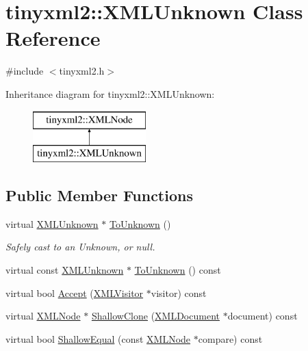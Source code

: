 \hypertarget{classtinyxml2_1_1_x_m_l_unknown}{}\section{tinyxml2\+:\+:X\+M\+L\+Unknown Class Reference}
\label{classtinyxml2_1_1_x_m_l_unknown}


{\ttfamily \#include $<$tinyxml2.\+h$>$}

Inheritance diagram for tinyxml2\+:\+:X\+M\+L\+Unknown\+:\begin{figure}[H]
\begin{center}
\leavevmode
\includegraphics[height=2.000000cm]{classtinyxml2_1_1_x_m_l_unknown}
\end{center}
\end{figure}
\subsection*{Public Member Functions}
\begin{DoxyCompactItemize}
\item 
virtual \hyperlink{classtinyxml2_1_1_x_m_l_unknown}{X\+M\+L\+Unknown} $\ast$ \hyperlink{classtinyxml2_1_1_x_m_l_unknown_af4374856421921cad578c8affae872b6}{To\+Unknown} ()
\begin{DoxyCompactList}\small\item\em Safely cast to an Unknown, or null. \end{DoxyCompactList}\item 
virtual const \hyperlink{classtinyxml2_1_1_x_m_l_unknown}{X\+M\+L\+Unknown} $\ast$ \hyperlink{classtinyxml2_1_1_x_m_l_unknown_a61b342b4f295cded1dc2f4402e97f07e}{To\+Unknown} () const
\item 
virtual bool \hyperlink{classtinyxml2_1_1_x_m_l_unknown_a8a06b8c82117ca969a432e17a46830fc}{Accept} (\hyperlink{classtinyxml2_1_1_x_m_l_visitor}{X\+M\+L\+Visitor} $\ast$visitor) const
\item 
virtual \hyperlink{classtinyxml2_1_1_x_m_l_node}{X\+M\+L\+Node} $\ast$ \hyperlink{classtinyxml2_1_1_x_m_l_unknown_ab73b48b819aa4b2ef3815dc2d7d20d5f}{Shallow\+Clone} (\hyperlink{classtinyxml2_1_1_x_m_l_document}{X\+M\+L\+Document} $\ast$document) const
\item 
virtual bool \hyperlink{classtinyxml2_1_1_x_m_l_unknown_ac46767cd721d666e690a6231dfb618d1}{Shallow\+Equal} (const \hyperlink{classtinyxml2_1_1_x_m_l_node}{X\+M\+L\+Node} $\ast$compare) const
\end{DoxyCompactItemize}
